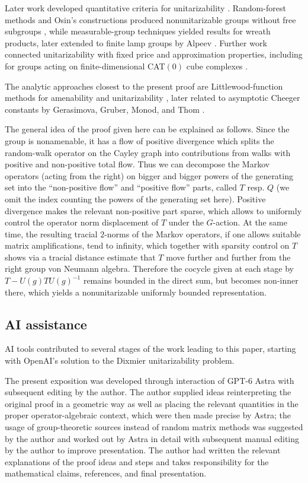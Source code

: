 \documentclass[a4paper,11pt]{amsproc}
\numberwithin{equation}{section}
\theoremstyle{definition}
\begin{document}
Later work developed quantitative criteria for unitarizability \cite{pisier98,pisier05}. Random-forest methods and Osin's constructions produced nonunitarizable groups without free subgroups \cite{em,osin}, while measurable-group techniques yielded results for wreath products, later extended to finite lamp groups by Alpeev \cite{monod,gl,mo,alpeev}. Further work connected unitarizability with fixed price and approximation properties, including for groups acting on finite-dimensional CAT$(0)$ cube complexes \cite{thom-forests,vergara}.

The analytic approaches closest to the present proof are Littlewood-function methods for amenability and unitarizability \cite{wysoczanski,bf,em}, later related to asymptotic Cheeger constants by Gerasimova, Gruber, Monod, and Thom \cite{ggmt}.

The general idea of the proof given here can be explained as follows. Since the group is nonamenable, it has a flow of positive divergence which splits the random-walk operator on the Cayley graph into contributions from walks with positive and non-positive total flow. Thus we can decompose the Markov operators (acting from the right) on bigger and bigger powers of the generating set into the ``non-positive flow'' and ``positive flow'' parts, called $T$ resp. $Q$ (we omit the index counting the powers of the generating set here). Positive divergence makes the relevant non-positive part sparse, which allows to uniformly control the operator norm displacement of $T$ under the $G$-action. At the same time, the resulting tracial $2$-norms of the Markov operators, if one allows suitable matrix amplifications, tend to infinity, which together with sparsity control on $T$ shows via a tracial distance estimate that $T$ move further and further from the right group von Neumann algebra. Therefore the cocycle given at each stage by $T - U(g)TU(g)^{-1}$ remains bounded in the direct sum, but becomes non-inner there, which yields a nonunitarizable uniformly bounded representation.

\subsection*{AI assistance}
AI tools contributed to several stages of the work leading to this paper, starting with OpenAI's solution to the Dixmier unitarizability problem.

The present exposition was developed through interaction of GPT-6 Astra with subsequent editing by the author. The author supplied ideas reinterpreting the original proof in a geometric way as well as placing the relevant quantities in the proper operator-algebraic context, which were then made precise by Astra; the usage of group-theoretic sources  instead of random matrix methods was suggested by the author and worked out by Astra in detail with subsequent manual editing by the author to improve presentation. The author had written the relevant explanations of the proof ideas and steps and takes responsibility for the mathematical claims, references, and final presentation.
\end{document}
